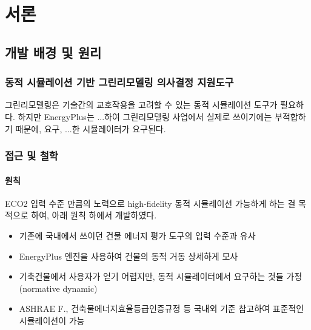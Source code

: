 \part{서론}
\label{part:introduction}


\chapter{개발 배경 및 원리}

\section{동적 시뮬레이션 기반 그린리모델링 의사결정 지원도구}

 그린리모델링은 기술간의 교호작용을 고려할 수 있는 동적 시뮬레이션 도구가 필요하다.
 하지만 EnergyPlus는 ...하여 그린리모델링 사업에서 실제로 쓰이기에는 부적합하기 때문에, 요구, ...한 시뮬레이터가 요구된다.


\section{ 접근 및 철학}

\subsection{원칙}
ECO2 입력 수준 만큼의 노력으로 high-fidelity 동적 시뮬레이션 가능하게 하는 걸 목적으로 하여, 아래 원칙 하에서 개발하였다.

\begin{itemize}
  \item 기존에 국내에서 쓰이던 건물 에너지 평가 도구의 입력 수준과 유사
  \item EnergyPlus 엔진을 사용하여 건물의 동적 거동 상세하게 모사
  \item 기축건물에서 사용자가 얻기 어렵지만, 동적 시뮬레이터에서 요구하는 것들 가정 (normative dynamic)
  \item ASHRAE F., 건축물에너지효율등급인증규정 등 국내외 기준 참고하여 표준적인 시뮬레이션이 가능
\end{itemize}

